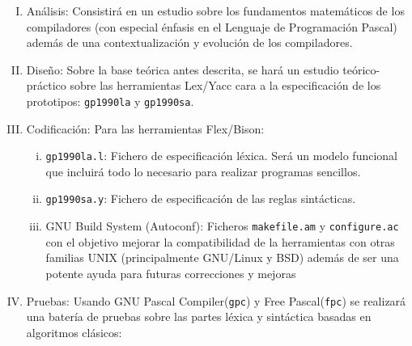 \begin{enumerate}[I.]

\item Análisis: Consistirá en un estudio sobre los fundamentos matemáticos de
los compiladores (con especial énfasis en el Lenguaje de Programación Pascal)
además de una contextualización y evolución de los compiladores.

\item Diseño: Sobre la base teórica antes descrita, se hará un estudio
teórico-práctico sobre las herramientas Lex/Yacc cara a la especificación de los prototipos:
\texttt{gp1990la} y \texttt{gp1990sa}.

\item Codificación: Para las herramientas Flex/Bison:

\begin{enumerate}[i.]

\item \texttt{gp1990la.l}: Fichero de especificación léxica. Será un modelo 
funcional que
incluirá todo lo necesario para realizar programas sencillos.

\item \texttt{gp1990sa.y}: Fichero de especificación de las reglas sintácticas.

\item GNU Build System 
(Autoconf): Ficheros \texttt{makefile.am} y 
\texttt{configure.ac} con el objetivo mejorar la
compatibilidad de la herramientas con otras familias UNIX (principalmente
GNU/Linux y BSD) además de ser una potente ayuda para futuras correcciones y
mejoras
\end{enumerate}


\item Pruebas: Usando GNU
Pascal Compiler(\texttt{gpc}) y Free
Pascal(\texttt{fpc}) se realizará una batería de pruebas sobre las partes léxica y
sintáctica basadas en algoritmos clásicos:


\end{enumerate}
